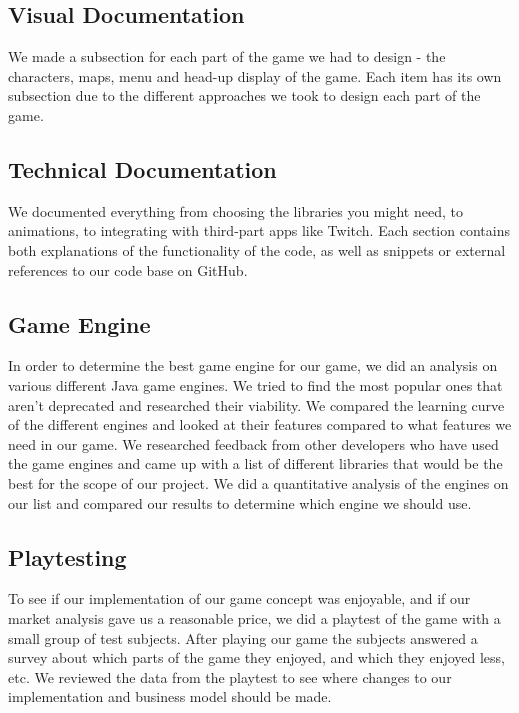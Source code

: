 \documentclass[12p]{article}
\begin{document}
\subsection{Visual Documentation}
We made a subsection for each part of the game we had to design - the characters, maps, menu and head-up display of the game. Each item has its own subsection due to the different approaches we took to design each part of the game. 

\subsection{Technical Documentation}
We documented everything from choosing the libraries you might need, to animations, to integrating with third-part apps like Twitch. Each section contains both explanations of the functionality of the code, as well as snippets or external references to our code base on GitHub.

\subsection{Game Engine}

In order to determine the best game engine for our game, we did an analysis on various different Java game engines. We tried to find the most popular ones that aren't deprecated and researched their viability. We compared the learning curve of the different engines and looked at their features compared to what features we need in our game. We researched feedback from other developers who have used the game engines and came up with a list of different libraries that would be the best for the scope of our project. We did a quantitative analysis of the engines on our list and compared our results to determine which engine we should use.

\subsection{Playtesting}

To see if our implementation of our game concept was enjoyable, and if our market analysis gave us a reasonable price, we did a playtest of the game with a small group of test subjects. After playing our game the subjects answered a survey about which parts of the game they enjoyed, and which they enjoyed less, etc. We reviewed the data from the playtest to see where changes to our implementation and business model should be made. 

\end{document}
